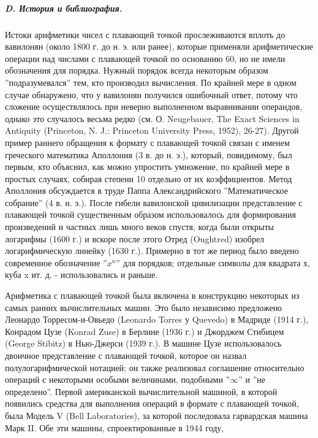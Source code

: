 \subparagraph{D. История и библиография.} Истоки арифметики чисел с плавающей точкой прослеживаются вплоть до вавилонян (около 1800 г. до н. э. или ранее), которые применяли арифметические операции над числами с плавающей точкой по основанию 60, но не имели обозначения для порядка. Нужный порядок всегда некоторым образом ''подразумевался'' тем, кто производил вычисления. По крайней мере в одном случае обнаружено, что у вавилонян получился ошибочный ответ, потому что сложение осуществлялось при неверно выполненном выравнивании операндов, однако это случалось весьма редко (см. О. Neugebauer, The Exact Sciences in Antiquity (Princeton, N. J.: Princeton University Press, 1952), 26-27). Другой пример раннего обращения к формату с плавающей точкой связан с именем греческого математика Аполлония (3 в. до н. э.), который, повидимому, был первым, кто объяснил, как можно упростить умножение, по крайней мере в простых случаях, собирая степени 10 отдельно от их коэффициентов. Метод Аполлония обсуждается в труде Паппа Александрийского ''Математическое собрание'' (4 в. н. э.). После гибели вавилонской цивилизации представление с плавающей точкой существенным образом использовалось для формирования произведений и частных лишь много веков спустя, когда были открыты логарифмы (1600 г.) и вскоре после этого Отред (Oughtred) изобрел логарифмическую линейку (1630 г.). Примерно в тот же период было введено современное обозначение ''$x^n$'' для порядков; отдельные символы для квадрата х, куба x ит. д. - использовались и раньше.

Арифметика с плавающей точкой была включена в конструкцию некоторых из самых ранних вычислительных машин. Это было независимо предложено Леонардо Торресом-и-Овьедо (Leonardo Torres у Quevedo) в Мадриде (1914 г.), Конрадом Цузе (Konrad Zuse) в Берлине (1936 г.) и Джорджем Стибицем (George Stibitz) в Нью-Джерси (1939 г.). В машине Цузе использовалось двоичное представление с плавающей точкой, которое он назвал полулогарифмической нотацией; он также реализовал соглашение относительно операций с некоторыми особыми величинами, подобными ''$\infty$'' и ''не определено''. Первой американской вычислительной машиной, в которой появились средства для выполнения операций в формате с плавающей точкой, была Модель V (Bell Laboratories), за которой последовала гарвардская машина Марк II. Обе эти машины, спроектированные в 1944 году,

